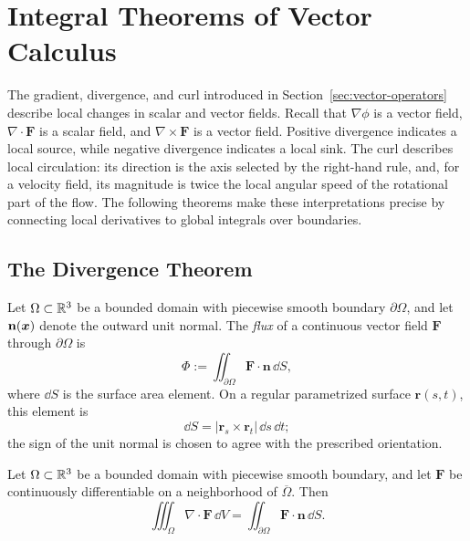 \section{Integral Theorems of Vector Calculus}
\label{sec:vector-integral-theorems}

The gradient, divergence, and curl introduced in Section~\ref{sec:vector-operators} describe local changes in scalar and vector fields. Recall that $\nabla\phi$ is a vector field, $\nabla\cdot\mathbf{F}$ is a scalar field, and $\nabla\times\mathbf{F}$ is a vector field. Positive divergence indicates a local source, while negative divergence indicates a local sink. The curl describes local circulation: its direction is the axis selected by the right-hand rule, and, for a velocity field, its magnitude is twice the local angular speed of the rotational part of the flow. The following theorems make these interpretations precise by connecting local derivatives to global integrals over boundaries.

\subsection{The Divergence Theorem}

\begin{definition}
Let $\Omega\subset\mathbb{R}^3$ be a bounded domain with piecewise smooth boundary $\partial\Omega$, and let $\mathbf{n}(\bm{x})$ denote the outward unit normal. The \emph{flux} of a continuous vector field $\mathbf{F}$ through $\partial\Omega$ is \[
\Phi := \iint_{\partial\Omega}\mathbf{F}\cdot\mathbf{n}\,\dd S,
\] where $\dd S$ is the surface area element. On a regular parametrized surface $\mathbf{r}(s,t)$, this element is
\[
\dd S=|\mathbf{r}_s\times\mathbf{r}_t|\,\dd s\,\dd t;
\]
the sign of the unit normal is chosen to agree with the prescribed orientation.
\end{definition}

\begin{theorem}
\label{thm:divergence}
Let $\Omega\subset\mathbb{R}^3$ be a bounded domain with piecewise smooth boundary, and let $\mathbf{F}$ be continuously differentiable on a neighborhood of $\overline\Omega$. Then
\begin{equation}
\iiint_\Omega\nabla\cdot\mathbf{F}\,\dd V
=\iint_{\partial\Omega}\mathbf{F}\cdot\mathbf{n}\,\dd S.
\end{equation}

\end{theorem}

